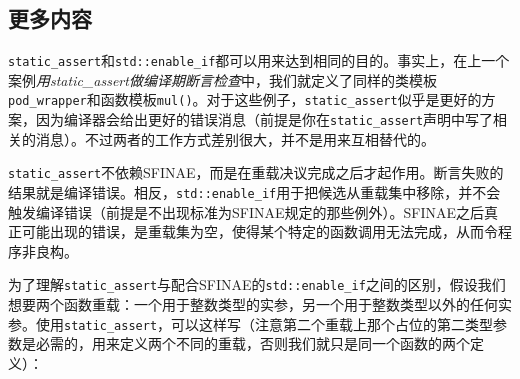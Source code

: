
\subsection{更多内容}



\texttt{static\_\allowbreak{}assert}和\texttt{std::\allowbreak{}enable\_\allowbreak{}if}都可以用来达到相同的目的。事实上，在上一个案例\textit{用static\_assert做编译期断言检查}中，我们就定义了同样的类模板\texttt{pod\_\allowbreak{}wrapper}和函数模板\texttt{mul()}。对于这些例子，\texttt{static\_\allowbreak{}assert}似乎是更好的方案，因为编译器会给出更好的错误消息（前提是你在\texttt{static\_\allowbreak{}assert}声明中写了相关的消息）。不过两者的工作方式差别很大，并不是用来互相替代的。



\texttt{static\_\allowbreak{}assert}不依赖SFINAE，而是在重载决议完成之后才起作用。断言失败的结果就是编译错误。相反，\texttt{std::\allowbreak{}enable\_\allowbreak{}if}用于把候选从重载集中移除，并不会触发编译错误（前提是不出现标准为SFINAE规定的那些例外）。SFINAE之后真正可能出现的错误，是重载集为空，使得某个特定的函数调用无法完成，从而令程序非良构。



为了理解\texttt{static\_\allowbreak{}assert}与配合SFINAE的\texttt{std::\allowbreak{}enable\_\allowbreak{}if}之间的区别，假设我们想要两个函数重载：一个用于整数类型的实参，另一个用于整数类型以外的任何实参。使用\texttt{static\_\allowbreak{}assert}，可以这样写（注意第二个重载上那个占位的第二类型参数是必需的，用来定义两个不同的重载，否则我们就只是同一个函数的两个定义）：



